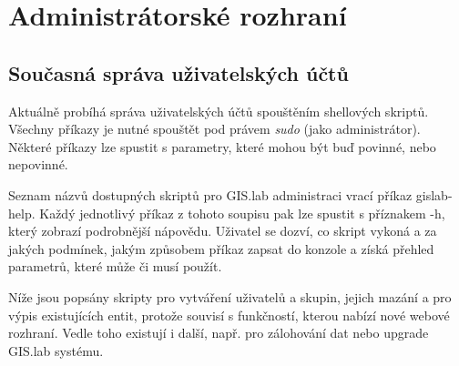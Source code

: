 \chapter{Administrátorské rozhraní}
\label{4-praxe}

\section{Současná správa uživatelských účtů}
\label{cmd-line}

Aktuálně probíhá správa uživatelských účtů spouštěním shellových
skriptů. Všechny příkazy je nutné spouštět pod právem
\textit{sudo} (jako administrátor). Některé příkazy lze spustit 
s parametry, které mohou být buď povinné, nebo nepovinné.

Seznam názvů dostupných skriptů pro GIS.lab administraci vrací příkaz
\textsf{gislab-help}. Každý jednotlivý příkaz z tohoto soupisu pak lze
spustit s příznakem \textsf{-h}, který zobrazí podrobnější
nápovědu. Uživatel se dozví, co skript vykoná a za jakých podmínek,
jakým způsobem příkaz zapsat do konzole a získá přehled parametrů,
které může či musí použít.

Níže jsou popsány skripty pro vytváření uživatelů a skupin, jejich
mazání a pro výpis existujících entit, protože souvisí s funkčností,
kterou nabízí nové webové rozhraní. Vedle toho existují i další,
např. pro zálohování dat nebo upgrade GIS.lab systému.


